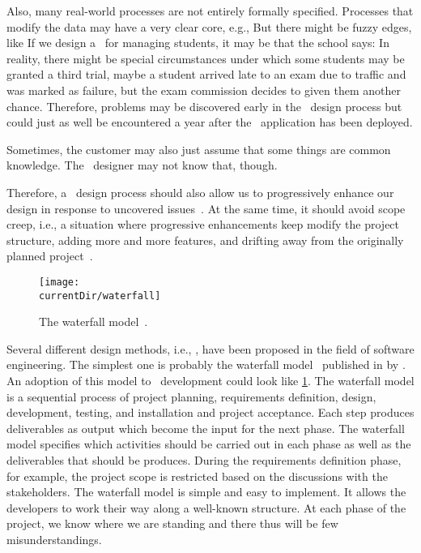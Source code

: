 Also, many real-world processes are not entirely formally specified.
Processes that modify the data may have a very clear core, e.g., 
But there might be fuzzy edges, like 
If we design a \db\ for managing students, it may be that the school says:
In reality, there might be special circumstances under which some students may be granted a third trial, maybe a student arrived late to an exam due to traffic and was marked as failure, but the exam commission decides to given them another chance.
Therefore, problems may be discovered early in the \db\ design process but could just as well be encountered a year after the \db\ application has been deployed.

Sometimes, the customer may also just assume that some things are common knowledge.
The \db\ designer may not know that, though.

Therefore, a \db\ design process should also allow us to progressively enhance our design in response to uncovered issues~\cite{GMTM2011DDLC,WK1989DKBSRTSDLC}.
At the same time, it should avoid scope creep, i.e., a situation where progressive enhancements keep modify the project structure, adding more and more features, and drifting away from the originally planned project~\cite{GMTM2011DDLC,WK1989DKBSRTSDLC}.%
%
%
%
\FloatBarrier%
%
\begin{figure}%
\centering%
\texttt{[image: \\currentDir/waterfall]}%
\caption{The waterfall model~\cite{R1970MTDOLSS,PM2020SEAPA,GMTM2011DDLC,I2018SAH,N2024SEFDS}.}%
\label{fig:model:waterfall}%
\end{figure}%
%
Several different design methods, i.e., , have been proposed in the field of software engineering.
The simplest one is probably the waterfall model~\cite{R1970MTDOLSS,PM2020SEAPA,GMTM2011DDLC,I2018SAH,N2024SEFDS} published in \citeyear{R1970MTDOLSS} by \citeauthor{R1970MTDOLSS}.
An adoption of this model to \db\ development could look like \cref{fig:model:waterfall}.
The waterfall model is a sequential process of project planning, requirements definition, design, development, testing, and installation and project acceptance.
Each step produces deliverables as output which become the input for the next phase.
The waterfall model specifies which activities should be carried out in each phase as well as the deliverables that should be produces.
During the requirements definition phase, for example, the project scope is restricted based on the discussions with the stakeholders.
The waterfall model is simple and easy to implement.
It allows the developers to work their way along a well-known structure.
At each phase of the project, we know where we are standing and there thus will be few misunderstandings.


